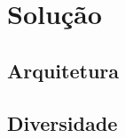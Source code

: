 \chapter{Solução}
\label{cha:solucao}

\section{Arquitetura}
\label{sec:arquitetura}

\section{Diversidade}
\label{sec:diversidade}

